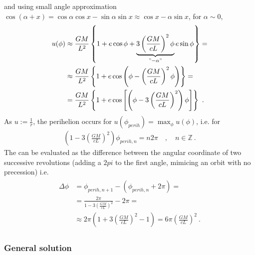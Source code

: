 \documentclass[letterpaper,10pt,english]{jupyterBook}
\begin{document}
\sphinxAtStartPar
and using small angle approximation \(\cos(\alpha + x ) = \cos \alpha \cos x - \sin \alpha \sin x \approx \cos x - \alpha \sin x \), for \(\alpha \sim 0\),
\begin{equation*}
\begin{split}\begin{aligned}
  u(\phi) 
  & \approx \frac{GM}{L^2} \left\{ 1 + e \cos \phi + \underbrace{ 3 \left( \frac{ GM}{cL} \right)^2 \phi}_{"-\alpha"} e \sin \phi \right\} = \\
  & \approx \frac{GM}{L^2} \left\{ 1 + e \cos \left( \phi - \left( \frac{GM}{cL} \right)^2 \phi \right) \right\} =  \\
  & = \frac{GM}{L^2} \left\{ 1 + e \cos \left[ \left( \phi - 3 \left(\frac{ GM}{c L} \right)^2 \right) \phi \right] \right\} \ .
\end{aligned}\end{split}
\end{equation*}
\sphinxAtStartPar
As \(u:= \frac{1}{r}\), the perihelion occurs for \(u(\phi_{perih}) = \max_{\phi} u(\phi)\), i.e. for
\begin{equation*}
\begin{split}\left( 1 - 3\left( \frac{GM}{c L} \right)^2 \right) \phi_{perih,n} = n 2 \pi \quad , \quad n \in \mathbb{Z} \ .\end{split}
\end{equation*}
\sphinxAtStartPar
The  can be evaluated as the difference between the angular coordinate of two successive revolutions (adding a \(2pi\) to the first angle, mimicing an orbit with no precession) i.e.
\begin{equation*}
\begin{split}\begin{aligned}
  \Delta \phi 
  & = \phi_{perih, n+1} - ( \phi_{perih, n} + 2 \pi ) = \\
  & = \frac{2 \pi}{1 - 3 \left(\frac{GM}{cL}\right)^2} - 2 \pi = \\
  & \approx 2 \pi \left( 1 + 3 \left( \frac{GM}{cL} \right)^2 - 1 \right) = 6 \pi \left( \frac{GM}{cL} \right)^2 \ .
\end{aligned}\end{split}
\end{equation*}\subsubsection*{General solution}
\end{document}
